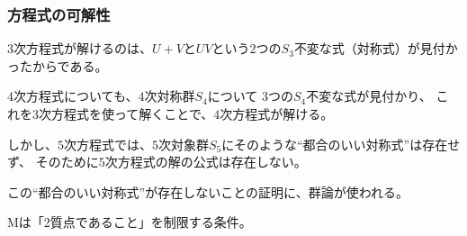 \documentclass[12pt, t]{beamer}
\begin{document}
\begin{frame}
\frametitle{方程式の可解性}
$3$次方程式が解けるのは、$U + V$と$UV$という$2$つの$S_3$不変な式（対称式）が見付かったからである。

$4$次方程式についても、$4$次対称群$S_4$について $3$つの$S_4$不変な式が見付かり、
これを$3$次方程式を使って解くことで、$4$次方程式が解ける。

しかし、$5$次方程式では、$5$次対象群$S_5$にそのような``都合のいい対称式''は存在せず、
そのために$5$次方程式の解の公式は存在しない。

この``都合のいい対称式''が存在しないことの証明に、群論が使われる。
\end{frame}

\begin{frame}
Mは「2質点であること」を制限する条件。

\end{frame}
\end{document}
